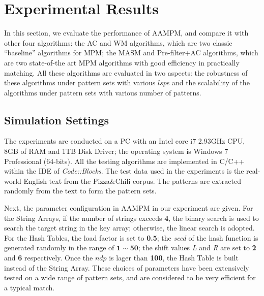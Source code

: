 \documentclass{article}
\begin{document}
\section{Experimental Results}
\label{sec:experiments}

In this section, we evaluate the performance of \textsf{AAMPM}, and
compare it with other four algorithms: the \textsf{AC} and \textsf{WM}
algorithms, which are two classic ``baseline'' algorithms for MPM; the
\textsf{MASM} and \textsf{Pre-filter+AC} algorithms, which are two
state-of-the art MPM algorithms with good efficiency in practically
matching. All these algorithms are evaluated in two aspects: the
robustness of these algorithms under pattern sets with various $lsp$s
and the scalability of the algorithms under pattern sets with various
number of patterns.

\subsection{Simulation Settings}

The experiments are conducted on a PC with an Intel core i7 2.93GHz
CPU, 8GB of RAM and 1TB Disk Driver; the operating system is Windows 7
Professional (64-bits). All the testing algorithms are implemented in
C/C++ within the IDE of \emph{Code::Blocks}. The test data used in the
experiments is the real-world English text from the Pizza\;\&\;Chili
corpus. The patterns are extracted randomly from the text to form the
pattern sets.

Next, the parameter configuration in \textsf{AAMPM} in our experiment
are given. For the String Arrays, if the number of strings exceeds
\textbf{4}, the binary search is used to search the target string in
the key array; otherwise, the linear search is adopted. For the Hash
Tables, the load factor is set to \textbf{0.5}; the \emph{seed} of the
hash function is generated randomly in the range of
$\mathbf{1} \sim \mathbf{50}$; the shift values \emph{L} and \emph{R}
are set to \textbf{2} and \textbf{6} respectively. Once the $ndp$ is
lager than \textbf{100}, the Hash Table is built instead of the String
Array. These choices of parameters have been extensively tested on a
wide range of pattern sets, and are considered to be very efficient
for a typical match.

\end{document}
